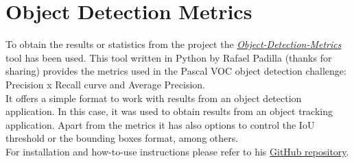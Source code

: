 \section{Object Detection Metrics} \label{metrics_tool}
To obtain the results or statistics from the project the \href{https://github.com/rafaelpadilla/Object-Detection-Metrics}{\textit{Object-Detection-Metrics}} tool has been used. This tool written in Python by Rafael Padilla (thanks for sharing) provides the metrics used in the Pascal VOC object detection challenge: Precision x Recall curve and Average Precision.\\
It offers a simple format to work with results from an object detection application. In this case, it was used to obtain results from an object tracking application. Apart from the metrics it has also options to control the IoU threshold or the bounding boxes format, among others.\\
For installation and how-to-use instructions please refer to his \href{https://github.com/rafaelpadilla/Object-Detection-Metrics}{GitHub repository}.
